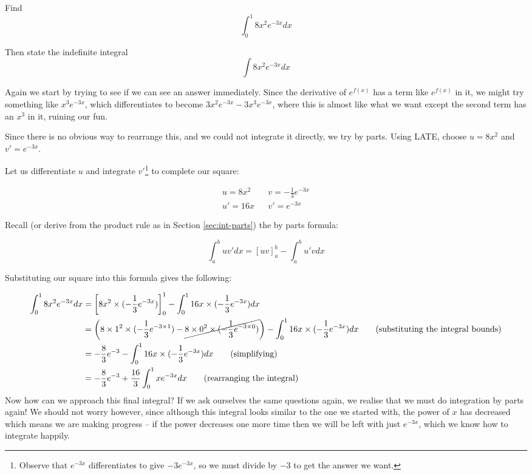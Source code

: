 \begin{example}
    Find
    \[ \int_0^{1} 8 x^2 e^{-3x} dx\]

    Then state the indefinite integral
    \[ \int 8 x^2 e^{-3x} dx\]
\end{example}
\begin{solution}
    Again we start by trying to see if we can see an answer immediately. Since the derivative of $e^{f(x)}$ has a term like $e^{f(x)}$ in it, we might try something like
    $x^3 e^{-3x}$, which differentiates to become $3x^2 e^{-3x} - 3x^3 e^{-3x}$, where this is almost like what we want except the second term has an $x^3$ in it, ruining our fun.

    Since there is no obvious way to rearrange this, and we could not integrate it directly, we try by parts. Using LATE, choose $u= 8x^2$ and $v' =e^{-3x}$.
    
    Let us differentiate $u$ and integrate $v'$\footnote{Observe that $e^{-3x}$ differentiates to give $-3e^{-3x}$, so we must divide by $-3$ to get the answer we want.} 
    to complete our square:

    \begin{align*}
        u = 8x^2 & & v = -\frac{1}{3}e^{-3x} \\
        u' = 16x & & v' = e^{-3x}
    \end{align*}
    
    Recall (or derive from the product rule as in Section \ref{sec:int-parts}) the by parts formula:

    \[ \int_a^b u v' dx= \left[uv\right]_a^b - \int_a^b u' v dx\]

    Substituting our square into this formula gives the following:

    \begin{align*}
        \int_0^{1} 8 x^2 e^{-3x} dx &= \left[8x^2\times (-\frac{1}{3}e^{-3x})\right]_0^{1} - \int_0^{1} 16x \times (-\frac{1}{3}e^{-3x}) dx \\
         &=  \left(8\times1^2\times (-\frac{1}{3}e^{-3\times 1}) - \cancel{8\times0^2\times (-\frac{1}{3}e^{-3\times 0})}\right) - \int_0^{1} 16x \times (-\frac{1}{3}e^{-3x}) dx \tag{substituting the integral bounds} \\
         &=  -\frac{8}{3}e^{-3}- \int_0^{1} 16x \times (-\frac{1}{3}e^{-3x}) dx \tag{simplifying} \\
         &= -\frac{8}{3}e^{-3} + \frac{16}{3}\int_0^{1} x  e^{-3x} dx \tag{rearranging the integral}
    \end{align*}
    Now how can we approach this final integral? If we ask ourselves the same questions again, we realise that we must do integration by parts again! 
    We should not worry however, since although this integral looks similar to the one we started with, the power of $x$ has decreased which means we are making progress -- 
    if the power decreases one more time then we will be left with just $e^{-3x}$, which we know how to integrate happily.


\end{solution}
